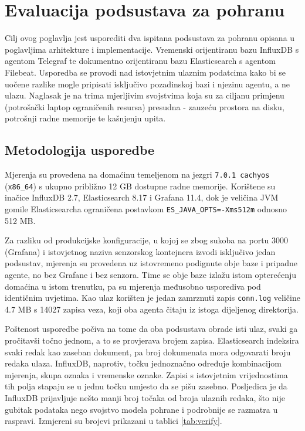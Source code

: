 \chapter{Evaluacija podsustava za \mbox{pohranu}}

Cilj ovog poglavlja jest usporediti dva ispitana podsustava za pohranu opisana u poglavljima arhitekture i implementacije. Vremenski orijentiranu bazu InfluxDB
s agentom Telegraf te dokumentno orijentiranu bazu Elasticsearch s agentom Filebeat. Usporedba se provodi nad istovjetnim ulaznim podatcima kako bi se
uočene razlike mogle pripisati isključivo pozadinskoj bazi i njezinu agentu, a ne ulazu. Naglasak je na trima mjerljivim svojstvima koja su za ciljanu primjenu
(potrošački laptop ograničenih resursa) presudna - zauzeću prostora na disku, potrošnji radne memorije te kašnjenju upita.

\section{Metodologija usporedbe}

Mjerenja su provedena na domaćinu temeljenom na jezgri \texttt{7.0.1 cachyos} (\texttt{x86\_64}) s ukupno približno 12 GB dostupne radne memorije.
Korištene su inačice InfluxDB 2.7, Elasticsearch 8.17 i Grafana 11.4, dok je veličina JVM gomile Elasticsearcha ograničena postavkom
\texttt{ES\_JAVA\_OPTS=-Xms512m} odnosno 512 MB.

Za razliku od produkcijske konfiguracije, u kojoj se zbog sukoba na portu 3000 (Grafana) i istovjetnog naziva senzorskog kontejnera izvodi isključivo jedan
podsustav, mjerenja su provedena uz istovremeno podignute obje baze i pripadne agente, no bez Grafane i bez senzora. Time se obje baze izlažu istom opterećenju
domaćina u istom trenutku, pa su mjerenja međusobno usporediva pod identičnim uvjetima. Kao ulaz korišten je jedan zamrznuti zapis \texttt{conn.log} veličine
4.7 MB s 14027 zapisa veza, koji oba agenta čitaju iz istoga dijeljenog direktorija.

Poštenost usporedbe počiva na tome da oba podsustava obrade isti ulaz, svaki ga pročitavši točno jednom, a to se provjerava brojem zapisa. Elasticsearch indeksira
svaki redak kao zaseban dokument, pa broj dokumenata mora odgovarati broju redaka ulaza. InfluxDB, naprotiv, točku jednoznačno određuje kombinacijom mjerenja,
skupa oznaka i vremenske oznake. Zapisi s istovjetnim vrijednostima tih polja stapaju se u jednu točku umjesto da se pišu zasebno. Posljedica je da InfluxDB
prijavljuje nešto manji broj točaka od broja ulaznih redaka, što nije gubitak podataka nego svojstvo modela pohrane i podrobnije se razmatra u raspravi.
Izmjereni su brojevi prikazani u tablici \ref{tab:verify}.

